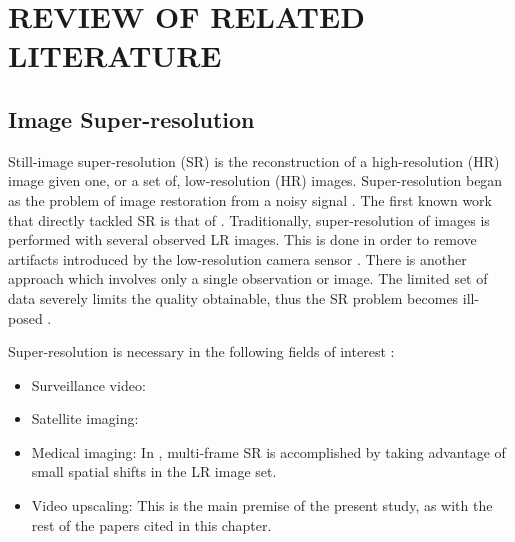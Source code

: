 
\chapter{REVIEW OF RELATED LITERATURE} %

\label{Chapter2} %



\section{Image Super-resolution}

Still-image super-resolution (SR) is the reconstruction of a high-resolution (HR) image given one, or a set of, low-resolution (HR) images. 
Super-resolution began as the problem of image restoration from a noisy signal \citep{Helstrom1967}.
The first known work that directly tackled SR is that of \cite{tsai1984multiframe}. 
Traditionally, super-resolution of images is performed with several observed LR images. This is done in order to remove artifacts introduced by the low-resolution camera sensor \citep{Yang2010a}. 
There is another approach which involves only a single observation or image.
The limited set of data severely limits the quality obtainable, thus 
the SR problem becomes ill-posed \citep{Yang2010a}.

Super-resolution is necessary in the following fields of interest \citep{Yang2010a}:
\begin{itemize}
	\item Surveillance video: 
	\item Satellite imaging:
	\item Medical imaging: In \cite{Malczewski2008}, multi-frame SR is accomplished by taking advantage of small spatial shifts in the LR image set.
	\item Video upscaling: This is the main premise of the present study, as with the rest of the papers cited in this chapter.
\end{itemize}

